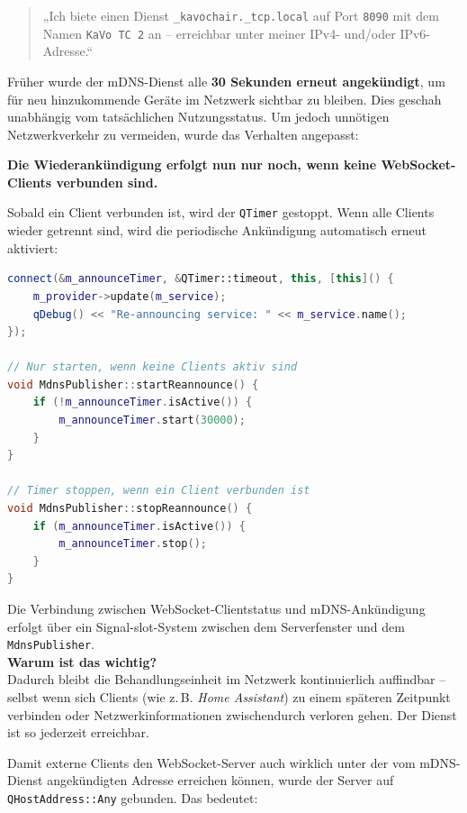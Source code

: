 \begin{quote}
„Ich biete einen Dienst \texttt{\_kavochair.\_tcp.local} auf Port \texttt{8090} mit dem Namen \texttt{KaVo TC 2} an – erreichbar unter meiner IPv4- und/oder IPv6-Adresse.“
\end{quote}

\vspace{0.5cm}
Früher wurde der mDNS-Dienst alle \textbf{30 Sekunden erneut angekündigt}, um für neu hinzukommende Geräte im Netzwerk sichtbar zu bleiben. Dies geschah unabhängig vom tatsächlichen Nutzungsstatus. Um jedoch unnötigen Netzwerkverkehr zu vermeiden, wurde das Verhalten angepasst:

\textbf{Die Wiederankündigung erfolgt nun nur noch, wenn keine WebSocket-Clients verbunden sind.}

Sobald ein Client verbunden ist, wird der \texttt{QTimer} gestoppt. Wenn alle Clients wieder getrennt sind, wird die periodische Ankündigung automatisch erneut aktiviert:
\vspace{1cm}
\begin{lstlisting}[language=c++,caption={mDNS-Wiederankündigung nur bei Inaktivität},label={lst:qmdns-conditional}]
connect(&m_announceTimer, &QTimer::timeout, this, [this]() {
    m_provider->update(m_service);
    qDebug() << "Re-announcing service: " << m_service.name();
});

// Nur starten, wenn keine Clients aktiv sind
void MdnsPublisher::startReannounce() {
    if (!m_announceTimer.isActive()) {
        m_announceTimer.start(30000);
    }
}

// Timer stoppen, wenn ein Client verbunden ist
void MdnsPublisher::stopReannounce() {
    if (m_announceTimer.isActive()) {
        m_announceTimer.stop();
    }
}
\end{lstlisting}
Die Verbindung zwischen WebSocket-Clientstatus und mDNS-Ankündigung erfolgt über ein Signal-slot-System zwischen dem Serverfenster und dem \texttt{MdnsPublisher}.\\

\vspace{0.5cm}
\textbf{Warum ist das wichtig?}\\ 
Dadurch bleibt die Behandlungseinheit im Netzwerk kontinuierlich auffindbar – selbst wenn sich Clients (wie z.\,B. \textit{Home Assistant}) zu einem späteren Zeitpunkt verbinden oder Netzwerkinformationen zwischendurch verloren gehen. Der Dienst ist so jederzeit erreichbar.

Damit externe Clients den WebSocket-Server auch wirklich unter der vom mDNS-Dienst angekündigten Adresse erreichen können, wurde der Server auf \texttt{QHostAddress::Any} gebunden. Das bedeutet:


